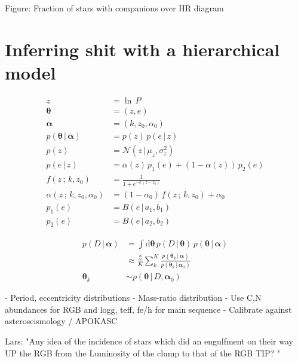 \documentclass[modern]{aastex62}
\newcommand{\given}{\,|\,}
\newcommand{\norm}{\mathcal{N}}
\newcommand{\dd}{\mathrm{d}}
\newcommand{\bs}[1]{\boldsymbol{#1}}
\begin{document}
Figure: Fraction of stars with companions over HR diagram

\section{Inferring shit with a hierarchical model} \label{sec:Pe}

\begin{align}
    z &= \ln\,P\\
    \bs{\theta} &= (z, e)\\
    \bs{\alpha} &= (k, z_0, \alpha_0)\\
    p(\bs{\theta} \given \bs{\alpha}) &= p(z) \, p(e \given z)\\
    p(z) &= \norm\left(z \given \mu_z, \sigma_z^2 \right)\\
    p(e \given z) &= \alpha(z) \, p_1(e) + (1-\alpha(z)) \, p_2(e)\\
    f(z\,;\,k,z_0) &= \frac{1}{1 + e^{-k\,(z - z_0)}}\\
    \alpha(z \,;\, k, z_0, \alpha_0) &= (1-\alpha_0) \, f(z \,;\, k, z_0) + \alpha_0\\
    p_1(e) &= B(e \given a_1, b_1)\\
    p_2(e) &= B(e \given a_2, b_2)
\end{align}

\begin{align}
    p(D \given \bs{\alpha}) &= \int \dd\bs{\theta} \,
        p(D \given \bs{\theta}) \, p(\bs{\theta} \given \bs{\alpha})\\
    &\approx \frac{\mathcal{Z}}{K} \sum_k^K
        \frac{p(\bs{\theta}_k \given \bs{\alpha})}
            {p(\bs{\theta}_k \given \bs{\alpha}_0)}\\
    \bs{\theta}_k &\sim p(\bs{\theta} \given D, \bs{\alpha}_0)
\end{align}

- Period, eccentricity distributions
- Mass-ratio distribution
     - Use C,N abundances for RGB and logg, teff, fe/h for main sequence
     - Calibrate against asteroseismology / APOKASC


Lars: "Any idea of the incidence of stars which did an engulfment on their way UP the RGB from the Luminosity of the clump to that of the RGB TIP? "

\end{document}
